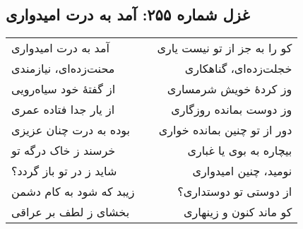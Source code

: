 \begin{center}
\section*{غزل شماره ۲۵۵: آمد به درت امیدواری}
\label{sec:255}
\begin{longtable}{l p{0.5cm} r}
آمد به درت امیدواری
&&
کو را به جز از تو نیست یاری
\\
محنت‌زده‌ای، نیازمندی
&&
خجلت‌زده‌ای، گناهکاری
\\
از گفتهٔ خود سیاه‌رویی
&&
وز کردهٔ خویش شرمساری
\\
از یار جدا فتاده عمری
&&
وز دوست بمانده روزگاری
\\
بوده به درت چنان عزیزی
&&
دور از تو چنین بمانده خواری
\\
خرسند ز خاک درگه تو
&&
بیچاره به بوی یا غباری
\\
شاید ز در تو باز گردد؟
&&
نومید، چنین امیدواری
\\
زیبد که شود به کام دشمن
&&
از دوستی تو دوستداری؟
\\
بخشای ز لطف بر عراقی
&&
کو ماند کنون و زینهاری
\\
\end{longtable}
\end{center}
